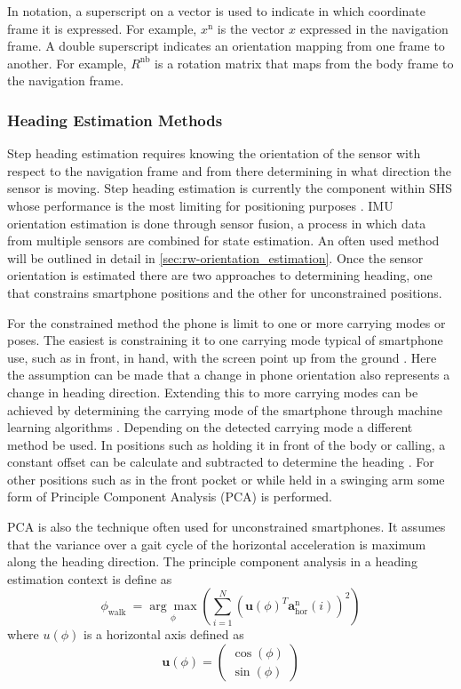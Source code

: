 In notation, a superscript on a vector is used to indicate in which coordinate frame it is expressed. For example, $x^\mathrm{n}$ is the vector $x$ expressed in the navigation frame. A double superscript indicates an orientation mapping from one frame to another. For example, $R^\mathrm{nb}$ is a rotation matrix that maps from the body frame to the navigation frame.

\subsubsection{Heading Estimation Methods}
Step heading estimation requires knowing the orientation of the sensor with respect to the navigation frame and from there determining in what direction the sensor is moving. Step heading estimation is currently the component within \ac{SHS} whose performance is the most limiting for positioning purposes \cite{Diez2018b, Qian2013,Combettes2017}. IMU orientation estimation is done through sensor fusion, a process in which data from multiple sensors are combined for state estimation. An often used method will be outlined in detail in \cref{sec:rw-orientation_estimation}.
Once the sensor orientation is estimated there are two approaches to determining heading, one that constrains smartphone positions and the other for unconstrained positions. 

For the constrained method the phone is limit to one or more carrying modes or poses. The easiest is constraining it to one carrying mode typical of smartphone use, such as in front, in hand, with the screen point up from the ground \cite{Deng2016}. Here the assumption can be made that a change in phone orientation also represents a change in heading direction. Extending this to more carrying modes can be achieved by determining the carrying mode of the smartphone through machine learning algorithms \cite{Lee2019, Sun2015a}. Depending on the detected carrying mode a different method be used. In positions such as holding it in front of the body or calling, a constant offset can be calculate and subtracted to determine the heading \cite{Sun2015a}. For other positions such as in the front pocket or while held in a swinging arm some form of Principle Component Analysis (PCA) \cite{Deng2016,Lee2019,Sun2015} is performed.\par

PCA is also the technique often used for unconstrained smartphones. It assumes that the variance over a gait cycle of the horizontal acceleration is maximum along the heading direction. The principle component analysis in a heading estimation context is define as
\begin{equation}
	\phi_{\text {walk }}=\underset{\phi}{\arg \max }\left(\sum_{i=1}^{N}\left(\mathbf{u}(\phi)^{T} \mathbf{a}^{\mathrm{n}}_\mathrm{hor}(i)\right)^{2}\right)
\end{equation}
where $ u(\phi) $ is a horizontal axis defined as
\begin{equation}
\mathbf{u}(\phi)=
\left(\begin{array}{l}
	\cos (\phi) \\
	\sin (\phi)  
\end{array}\right)
\end{equation}

